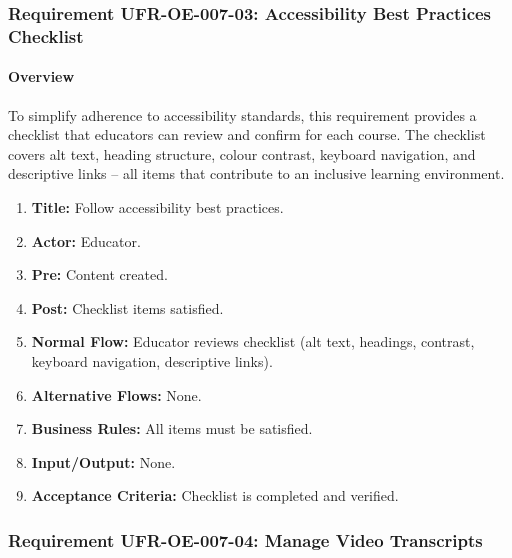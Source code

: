 \subsubsection{Requirement UFR-OE-007-03: Accessibility Best Practices Checklist}
\paragraph{Overview}
To simplify adherence to accessibility standards, this requirement provides a checklist that educators can review and confirm for each course. The checklist covers alt text, heading structure, colour contrast, keyboard navigation, and descriptive links – all items that contribute to an inclusive learning environment.
\begin{enumerate}[label=\textbf{\arabic*.}]
\item \textbf{Title:} Follow accessibility best practices.
\item \textbf{Actor:} Educator.
\item \textbf{Pre:} Content created.
\item \textbf{Post:} Checklist items satisfied.
\item \textbf{Normal Flow:} Educator reviews checklist (alt text, headings, contrast, keyboard navigation, descriptive links).
\item \textbf{Alternative Flows:} None.
\item \textbf{Business Rules:} All items must be satisfied.
\item \textbf{Input/Output:} None.
\item \textbf{Acceptance Criteria:} Checklist is completed and verified.
\end{enumerate}

\subsubsection{Requirement UFR-OE-007-04: Manage Video Transcripts}
